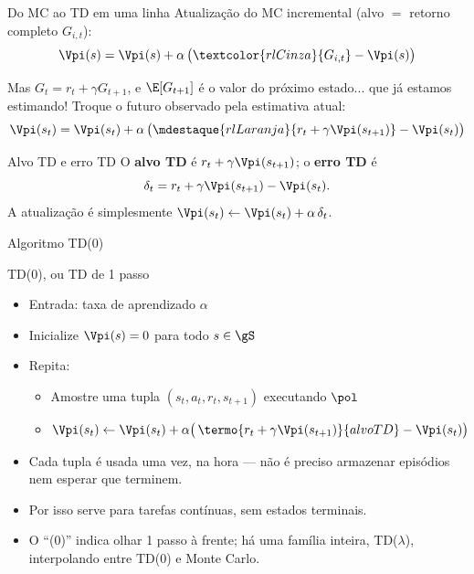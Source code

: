 \documentclass[aspectratio=169, 11pt]{beamer}
\begin{document}
\begin{frame}{Do MC ao TD em uma linha}
  Atualização do MC incremental (alvo $=$ retorno completo $G_{i,t}$):
  \[
    \Vpi(s) = \Vpi(s) + \alpha\,\bigl(\textcolor{rlCinza}{G_{i,t}} - \Vpi(s)\bigr)
  \]

  Mas $G_t = r_t + \gamma G_{t+1}$, e $\E[G_{t+1}] $ é o valor do próximo
  estado... que já estamos estimando! Troque o futuro observado pela
  estimativa atual:
  \[
    \Vpi(s_t) = \Vpi(s_t)
      + \alpha\,\bigl(\mdestaque{rlLaranja}{r_t + \gamma \Vpi(s_{t+1})} - \Vpi(s_t)\bigr)
  \]

  \begin{defbox}{Alvo TD e erro TD}
    O \textbf{alvo TD} é $r_t + \gamma \Vpi(s_{t+1})$; o \textbf{erro TD} é
    \[
      \delta_t = r_t + \gamma \Vpi(s_{t+1}) - \Vpi(s_t).
    \]
    A atualização é simplesmente $\Vpi(s_t) \leftarrow \Vpi(s_t) + \alpha\,\delta_t$.
  \end{defbox}
\end{frame}

\begin{frame}{Algoritmo TD(0)}
  \begin{algbox}{TD(0), ou TD de 1 passo}
    \begin{itemize}\setlength{\itemsep}{0.2ex}
      \item Entrada: taxa de aprendizado $\alpha$
      \item Inicialize $\Vpi(s) = 0$ para todo $s \in \gS$
      \item Repita:
      \begin{itemize}
        \item Amostre uma tupla $(s_t, a_t, r_t, s_{t+1})$ executando $\pol$
        \item $\Vpi(s_t) \leftarrow \Vpi(s_t)
          + \alpha\bigl(\,\termo{r_t + \gamma \Vpi(s_{t+1})}{alvo TD} - \Vpi(s_t)\bigr)$
      \end{itemize}
    \end{itemize}
  \end{algbox}

  \begin{itemize}
    \item Cada tupla é usada uma vez, na hora — não é preciso armazenar
      episódios nem esperar que terminem.
    \item Por isso serve para tarefas contínuas, sem estados terminais.
    \item O ``(0)'' indica olhar 1 passo à frente; há uma família inteira,
      TD($\lambda$), interpolando entre TD(0) e Monte Carlo.
  \end{itemize}
\end{frame}
\end{document}
